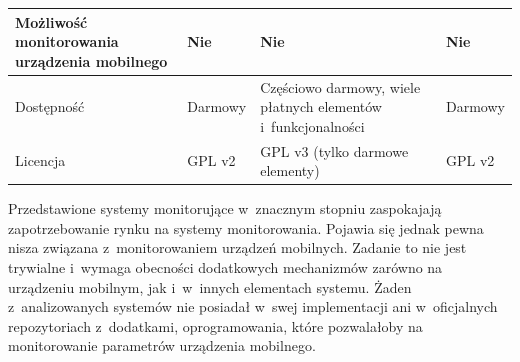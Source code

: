 \begin{longtable}[c]{|p{4.5cm}||p{3cm}|p{3cm}|p{3cm}|}
  \raggedright{Możliwość monitorowania urządzenia mobilnego} & \raggedright{Nie} &
  \raggedright{Nie} & \raggedright{Nie}
  \tabularnewline
  \hline

  \raggedright{Dostępność} & \raggedright{Darmowy} &
  \raggedright{Częściowo darmowy, wiele płatnych elementów i~funkcjonalności} & \raggedright{Darmowy}
  \tabularnewline
  \hline

  \raggedright{Licencja} & \raggedright{GPL v2} &
  \raggedright{GPL v3 (tylko darmowe elementy)} & \raggedright{GPL v2}
  \tabularnewline
  \hline

\end{longtable}

Przedstawione systemy monitorujące w~znacznym stopniu zaspokajają
zapotrzebowanie rynku na systemy monitorowania. Pojawia się jednak
pewna nisza związana z~monitorowaniem urządzeń mobilnych. Zadanie to
nie jest trywialne i~wymaga obecności dodatkowych mechanizmów zarówno
na urządzeniu mobilnym, jak i~w~innych elementach systemu. Żaden
z~analizowanych systemów nie posiadał w~swej implementacji ani
w~oficjalnych repozytoriach z~dodatkami, oprogramowania, które
pozwalałoby na monitorowanie parametrów urządzenia mobilnego.

